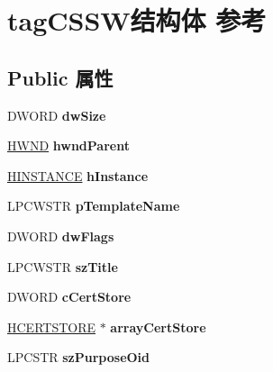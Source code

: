 \hypertarget{structtag_c_s_s_w}{}\section{tag\+C\+S\+S\+W结构体 参考}
\label{structtag_c_s_s_w}
\subsection*{Public 属性}
\begin{DoxyCompactItemize}
\item 
\mbox{\label{structtag_c_s_s_w_af23d1dcd2f6359df40521c06730afaab}} 
D\+W\+O\+RD {\bfseries dw\+Size}
\item 
\mbox{\label{structtag_c_s_s_w_afad1a9169715a8e978d0a8ec4b7c99c5}} 
\hyperlink{interfacevoid}{H\+W\+ND} {\bfseries hwnd\+Parent}
\item 
\mbox{\label{structtag_c_s_s_w_af82e8332b88ad6af3bf6b30206d03468}} 
\hyperlink{interfacevoid}{H\+I\+N\+S\+T\+A\+N\+CE} {\bfseries h\+Instance}
\item 
\mbox{\label{structtag_c_s_s_w_aa1fd6510c9943a9bbbbe91ea1eff4af4}} 
L\+P\+C\+W\+S\+TR {\bfseries p\+Template\+Name}
\item 
\mbox{\label{structtag_c_s_s_w_aede5aab00ec2917281d79569dff07220}} 
D\+W\+O\+RD {\bfseries dw\+Flags}
\item 
\mbox{\label{structtag_c_s_s_w_ad0edf0136a7f1b18a6757578470939a7}} 
L\+P\+C\+W\+S\+TR {\bfseries sz\+Title}
\item 
\mbox{\label{structtag_c_s_s_w_a801df62712e3d0d12d1bd3c9a41ab571}} 
D\+W\+O\+RD {\bfseries c\+Cert\+Store}
\item 
\mbox{\label{structtag_c_s_s_w_a9d5b655e4e13b73162ee15194fd85e89}} 
\hyperlink{interfacevoid}{H\+C\+E\+R\+T\+S\+T\+O\+RE} $\ast$ {\bfseries array\+Cert\+Store}
\item 
\mbox{\label{structtag_c_s_s_w_a68626431c09499d99d960bb7c19acc44}} 
L\+P\+C\+S\+TR {\bfseries sz\+Purpose\+Oid}

\end{DoxyCompactItemize}
